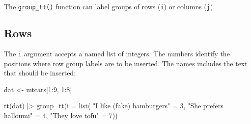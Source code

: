 \documentclass[
  letterpaper,
  DIV=11,
  numbers=noendperiod]{scrartcl}
\newenvironment{Shaded}{\begin{snugshade}}{\end{snugshade}}
\newcommand{\AttributeTok}[1]{\textcolor[rgb]{0.40,0.45,0.13}{#1}}
\newcommand{\DecValTok}[1]{\textcolor[rgb]{0.68,0.00,0.00}{#1}}
\newcommand{\FunctionTok}[1]{\textcolor[rgb]{0.28,0.35,0.67}{#1}}
\newcommand{\NormalTok}[1]{\textcolor[rgb]{0.00,0.23,0.31}{#1}}
\newcommand{\OtherTok}[1]{\textcolor[rgb]{0.00,0.23,0.31}{#1}}
\newcommand{\SpecialCharTok}[1]{\textcolor[rgb]{0.37,0.37,0.37}{#1}}
\newcommand{\StringTok}[1]{\textcolor[rgb]{0.13,0.47,0.30}{#1}}
\begin{document}
The \texttt{group\_tt()} function can label groups of rows (\texttt{i})
or columns (\texttt{j}).

\subsection{Rows}\label{rows}

The \texttt{i} argument accepts a named list of integers. The numbers
identify the positions where row group labels are to be inserted. The
names includes the text that should be inserted:

\begin{Shaded}
\begin{Highlighting}[]
\NormalTok{dat }\OtherTok{\textless{}{-}}\NormalTok{ mtcars[}\DecValTok{1}\SpecialCharTok{:}\DecValTok{9}\NormalTok{, }\DecValTok{1}\SpecialCharTok{:}\DecValTok{8}\NormalTok{]}

\FunctionTok{tt}\NormalTok{(dat) }\SpecialCharTok{|\textgreater{}} 
  \FunctionTok{group\_tt}\NormalTok{(}\AttributeTok{i =} \FunctionTok{list}\NormalTok{(}
    \StringTok{"I like (fake) hamburgers"} \OtherTok{=} \DecValTok{3}\NormalTok{,}
    \StringTok{"She prefers halloumi"} \OtherTok{=} \DecValTok{4}\NormalTok{,}
    \StringTok{"They love tofu"} \OtherTok{=} \DecValTok{7}\NormalTok{))}
\end{Highlighting}
\end{Shaded}
\end{document}
